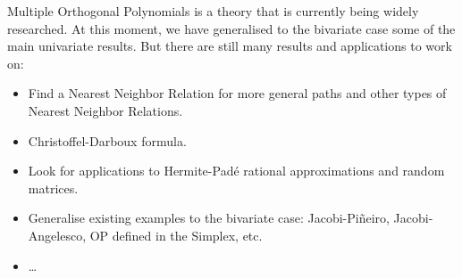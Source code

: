 \documentclass[portrait,final,a0paper,fontscale=0.38]{baposter}
\begin{document}
\begin{poster}
{
  Multiple Orthogonal Polynomials is a theory that is currently being widely researched. At this moment, we have generalised to the bivariate case some of the main univariate results. But there are still many results and applications to work on:
  \begin{itemize}
    \item Find a Nearest Neighbor Relation for more general paths and other types of Nearest Neighbor Relations.
    \item Christoffel-Darboux formula.
    \item Look for applications to Hermite-Padé rational approximations and random matrices.
    \item Generalise existing examples to the bivariate case: Jacobi-Piñeiro, Jacobi-Angelesco, OP defined in the Simplex, etc.
    \item \dots
  \end{itemize}


}





































\end{poster}
\end{document}
